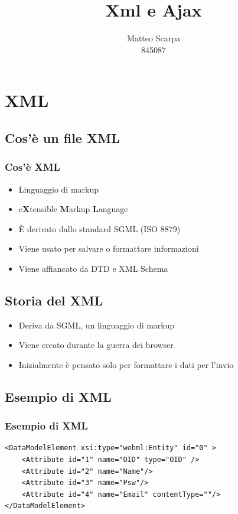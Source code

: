 \documentclass{beamer}
\title{Xml e Ajax}
\author{Matteo Scarpa\\ 845087}
\date{}
\institute{Università Ca'Foscari}
\begin{document}
\begin{frame}
   \maketitle
\end{frame}

\section{XML}

\subsection{Cos'è un file XML}
\begin{frame}
    \frametitle{Cos'è XML}
    \begin{itemize}
        \item Linguaggio di markup
        \item e\textbf{X}tensible \textbf{M}arkup \textbf{L}anguage
        \item È derivato dallo standard SGML (ISO 8879)
        \item Viene usato per salvare o formattare informazioni
        \item Viene affiancato da DTD e XML Schema
    \end{itemize}
\end{frame}

\subsection{Storia del XML}
\begin{frame}
    \begin{itemize}
    \item Deriva da SGML, un linguaggio di markup
    \item Viene creato durante la guerra dei browser
    \item Inizialmente è pensato solo per formattare i dati per l'invio
    \end{itemize}

\end{frame}



\subsection{Esempio di XML}
\begin{frame}[fragile]
    \frametitle{Esempio di XML}
    \begin{verbatim}
<DataModelElement xsi:type="webml:Entity" id="0" >       
    <Attribute id="1" name="OID" type="OID" /> 
    <Attribute id="2" name="Name"/> 
    <Attribute id="3" name="Psw"/> 
    <Attribute id="4" name="Email" contentType=""/> 
</DataModelElement> 
    \end{verbatim}
\end{frame}
\end{document}
